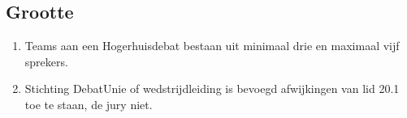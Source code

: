 \subsection{Grootte}

\begin{enumerate}
\item Teams aan een Hogerhuisdebat bestaan uit minimaal drie en maximaal vijf sprekers.
\item Stichting DebatUnie of wedstrijdleiding is bevoegd afwijkingen van lid 20.1 toe te staan, de jury niet.
\end{enumerate}
